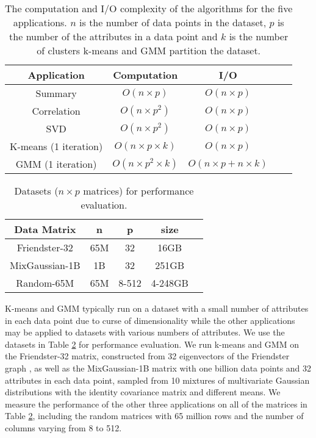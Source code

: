 \begin{table}
\begin{center}
\footnotesize
\begin{tabular}{|c|c|c|c|c|}
\hline
Application & Computation & I/O \\
\hline
Summary & $O(n \times p)$ & $O(n \times p)$ \\
\hline
Correlation & $O(n \times p^2)$ & $O(n \times p)$ \\
\hline
SVD & $O(n \times p^2)$ & $O(n \times p)$ \\
\hline
K-means (1 iteration) & $O(n \times p \times k)$ & $O(n \times p)$ \\
\hline
GMM (1 iteration) & $O(n \times p^2 \times k)$ & $O(n \times p + n \times k)$ \\
\hline
\end{tabular}
\normalsize
\end{center}
\caption{The computation and I/O complexity of the algorithms for the five
	applications. $n$ is the number of data points in the dataset, $p$ is
	the number of the attributes in a data point and $k$ is the number of
clusters k-means and GMM partition the dataset.}
\label{tbl:algs}
\end{table}

\begin{table}
\begin{center}
\footnotesize
\begin{tabular}{|c|c|c|c|c|}
\hline
Data Matrix & n & p & size \\
\hline
Friendster-32 \cite{friendster} & 65M & 32 & 16GB \\
\hline
MixGaussian-1B & 1B & 32 & 251GB \\
\hline
Random-65M & 65M & 8-512 & 4-248GB \\
\hline
\end{tabular}
\normalsize
\end{center}
\caption{Datasets ($n \times p$ matrices) for performance evaluation.}
\label{tbl:data}
\end{table}

K-means and GMM typically run on a dataset with a small number of attributes
in each data point
due to curse of dimensionality \cite{Jain00} while the other applications may
be applied to datasets with various numbers of attributes. We use the datasets
in Table \ref{tbl:data} for performance evaluation. We run k-means and GMM on
the Friendster-32 matrix, constructed from 32 eigenvectors of the Friendster
graph \cite{friendster}, as well as the MixGaussian-1B matrix with one billion
data points and 32 attributes in each data point, sampled from 10 mixtures of
multivariate Gaussian distributions
with the identity covariance matrix and different means. We measure the performance
of the other three applications on all of the matrices in Table \ref{tbl:data},
including the random matrices with 65 million rows and the number of columns
varying from 8 to 512.

